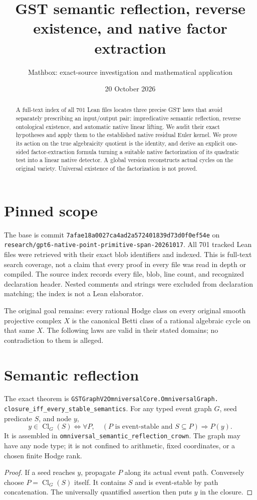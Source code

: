 \documentclass[11pt]{article}
\title{GST semantic reflection, reverse existence, and native factor extraction}
\author{Mathbox: exact-source investigation and mathematical application}
\date{20 October 2026}
\begin{document}
\maketitle
\begin{abstract}
A full-text index of all 701 Lean files locates three precise GST laws
that avoid separately prescribing an input/output pair: impredicative
semantic reflection, reverse ontological existence, and automatic
native linear lifting. We audit their exact hypotheses and apply them
to the established native residual Euler kernel. We prove its action
on the true algebraicity quotient is the identity, and derive an
explicit one-sided factor-extraction formula turning a suitable
native factorization of its quadratic test into a linear native
detector. A global version reconstructs actual cycles on the original
variety. Universal existence of the factorization is not proved.
\end{abstract}

\section{Pinned scope}
The base is commit
\texttt{7afae18a0027ca4ad2a572401839d73d0f0ef54e}
on \texttt{research/gpt6-native-point-primitive-span-20261017}.
All 701 tracked Lean files were retrieved with their exact blob
identifiers and indexed. This is full-text search coverage, not
a claim that every proof in every file was read in depth or compiled.
The source index records every file, blob, line count, and recognized
declaration header. Nested comments and strings were excluded
from declaration matching; the index is not a Lean elaborator.

The original goal remains: every rational Hodge class on every
original smooth projective complex $X$ is the canonical Betti class
of a rational algebraic cycle on that same $X$.
The following laws are valid in their stated domains; no
contradiction to them is alleged.

\section{Semantic reflection}
The exact theorem is
\texttt{GSTGraphV2OmniversalCore.OmniversalGraph.}\\
\texttt{closure\_iff\_every\_stable\_semantics}.
For any typed event graph $G$, seed predicate $S$, and node $y$,
\[
 \boxed{y\in\operatorname{Cl}_G(S)
 \iff
 \forall P,\quad
 (P\text{ is event-stable and }S\subseteq P)\Longrightarrow P(y).}
                                                               \tag{1}
\]
It is assembled in \texttt{omniversal\_semantic\_reflection\_crown}.
The graph may have any node type; it is not confined to arithmetic,
fixed coordinates, or a chosen finite Hodge rank.
\begin{proof}
If a seed reaches $y$, propagate $P$ along its actual event path.
Conversely choose $P=\operatorname{Cl}_G(S)$ itself.
It contains $S$ and is event-stable by path concatenation.
The universally quantified assertion then puts $y$ in the closure.
\end{proof}
\end{document}
